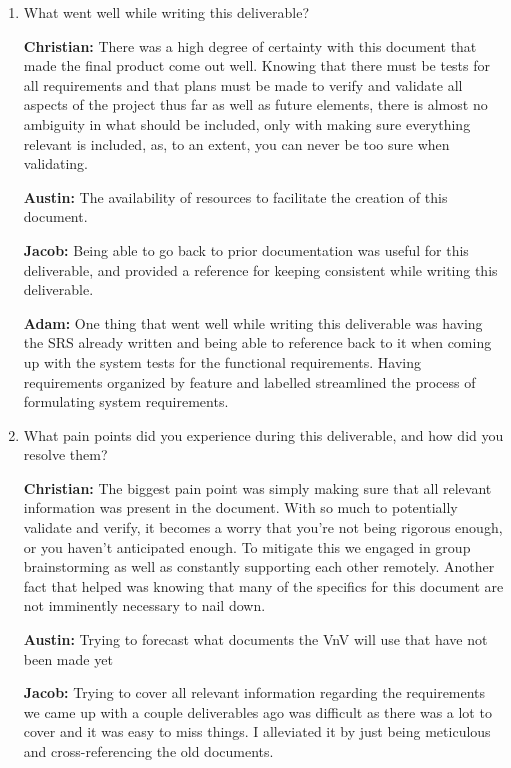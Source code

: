 \documentclass[12pt, titlepage]{article}
\begin{document}
\begin{enumerate}
  \item What went well while writing this deliverable? 

  \textbf{Christian:} There was a high degree of certainty with this document that made the final product come out well. Knowing that there must be tests for all requirements and that plans must be made to verify and validate all aspects of the project thus far as well as future elements, there is almost no ambiguity in what should be included, only with making sure everything relevant is included, as, to an extent, you can never be too sure when validating.
  
  \textbf{Austin:} The availability of resources to facilitate the creation of this document.
  
  \textbf{Jacob:} Being able to go back to prior documentation was useful for this deliverable, and provided a reference for keeping consistent while writing this deliverable.

  \textbf{Adam:} One thing that went well while writing this deliverable was having the SRS already written and being able to reference back to it when coming up with the system tests for the functional requirements. Having requirements organized by feature and labelled streamlined the process of formulating system requirements.

  \item What pain points did you experience during this deliverable, and how
    did you resolve them?

  \textbf{Christian:} The biggest pain point was simply making sure that all relevant information was present in the document. With so much to potentially validate and verify, it becomes a worry that you're not being rigorous enough, or you haven't anticipated enough. To mitigate this we engaged in group brainstorming as well as constantly supporting each other remotely. Another fact that helped was knowing that many of the specifics for this document are not imminently necessary to nail down.
  
  \textbf{Austin:} Trying to forecast what documents the VnV will use that have not been made yet
  
  \textbf{Jacob:} Trying to cover all relevant information regarding the requirements we came up with a couple deliverables ago was difficult as there was a lot to cover and it was easy to miss things. I alleviated it by just being meticulous and cross-referencing the old documents.


\end{enumerate}
\end{document}
